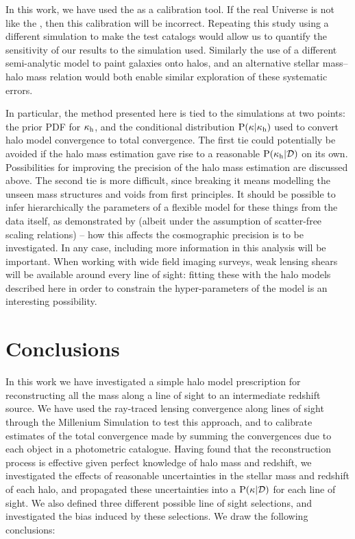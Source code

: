 \documentclass[useAMS,usenatbib]{mn2e}
\begin{document}
In this work, we have used 
the \MS as a calibration tool. If the real Universe is not
like the \MS, then this calibration will be incorrect. Repeating this 
study using
a different simulation to make the test catalogs would allow us to quantify
the sensitivity of our results to the simulation used. Similarly the use of a
different semi-analytic model to paint galaxies onto halos, and an alternative
stellar mass--halo mass relation would both enable similar exploration of
these systematic errors.

In particular, the method presented here is tied to the simulations at two
points: the prior PDF for $\kappa_{\rm h}$, and the conditional distribution
${\rm P}(\kappa|\kappa_{\rm h})$ used to convert halo model convergence to total
convergence. The first tie could potentially be avoided if the halo mass
estimation gave rise to a reasonable ${\rm P}(\kappa_{\rm h}|{\mathcal{D}})$ on its own.
Possibilities for improving the precision of the halo mass estimation are
discussed above. The second tie is more difficult, since breaking it means
modelling the unseen mass structures and voids from first principles. It
should be possible to infer hierarchically  the parameters of a flexible model
for these things from the data itself, as demonstrated by
\citet{KarpenkaEtal2012} (albeit under the assumption of scatter-free scaling
relations) -- how this affects the cosmographic precision is to be
investigated.  In any case, 
including more information in this analysis will be important.
When working with wide field imaging surveys,  weak lensing shears will be
available around every line of sight:  fitting these with the halo models
described here in order to constrain the hyper-parameters of the model is an
interesting possibility.



\section{Conclusions}
\label{sec:conclude}

In this work we have investigated a simple halo model prescription for
reconstructing all the mass along a line of sight to an intermediate redshift
source. We have used the ray-traced lensing convergence along lines of sight
through the Millenium Simulation to test this approach, and to calibrate
estimates of the total convergence made by summing the convergences due to
each object in a photometric catalogue. Having found that the reconstruction
process is effective given perfect knowledge of halo mass and redshift, we
investigated the effects of reasonable uncertainties in the stellar mass and
redshift of each halo, and propagated these uncertainties into a
${\rm P}(\kappa|{\mathcal{D}})$ for each line of sight. We also defined three different
possible line of sight selections, and investigated the bias induced by these
selections. We draw the following conclusions:
\end{document}
